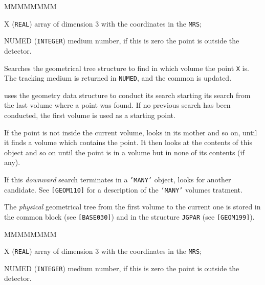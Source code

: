        
       


\begin{DLtt}{MMMMMMMM}
\item[X] ({\tt REAL}) array of dimension 3 with the coordinates in the 
{\tt MRS};
\item[NUMED] ({\tt INTEGER}) medium number, if this is zero the point is 
outside the detector.
\end{DLtt}

Searches the geometrical tree structure to find in which volume the point 
{\tt X} is. The tracking medium is returned in {\tt NUMED}, and the common 
 is updated.
 
 uses the geometry data structure to conduct its search
starting its search from the last volume where a point was found.
If no previous search has been conducted, the first volume is used
as a starting point.

If the point is not inside the current volume,  looks in its 
mother and so on, until it finds a volume which contains the point.
It then looks at the contents of this object and so on until the point 
is in a volume but in none of its contents (if any).

If this {\it downward} search terminates in a
{\tt 'MANY'} object,  looks for another candidate. See
{\tt [GEOM110]} for a description of the {\tt `MANY'} volumes tratment.

The {\it physical} geometrical tree from the first volume
to the current one is stored in the common block 
(see {\tt [BASE030]}) and in the structure {\tt JGPAR} (see {\tt [GEOM199]}).

\begin{DLtt}{MMMMMMMM}
\item[X] ({\tt REAL}) array of dimension 3 with the coordinates in the 
{\tt MRS};
\item[NUMED] ({\tt INTEGER}) medium number, if this is zero the point is 
outside the detector.
\end{DLtt}

